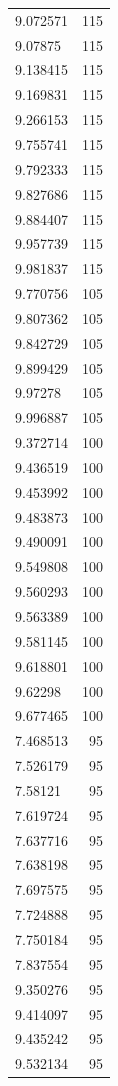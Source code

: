 \begin{table}[ht]
\begin{tabular}{lr}
  9.072571 & 115 \\ 
  9.07875 & 115 \\ 
  9.138415 & 115 \\ 
  9.169831 & 115 \\ 
  9.266153 & 115 \\ 
  9.755741 & 115 \\ 
  9.792333 & 115 \\ 
  9.827686 & 115 \\ 
  9.884407 & 115 \\ 
  9.957739 & 115 \\ 
  9.981837 & 115 \\ 
  9.770756 & 105 \\ 
  9.807362 & 105 \\ 
  9.842729 & 105 \\ 
  9.899429 & 105 \\ 
  9.97278 & 105 \\ 
  9.996887 & 105 \\ 
  9.372714 & 100 \\ 
  9.436519 & 100 \\ 
  9.453992 & 100 \\ 
  9.483873 & 100 \\ 
  9.490091 & 100 \\ 
  9.549808 & 100 \\ 
  9.560293 & 100 \\ 
  9.563389 & 100 \\ 
  9.581145 & 100 \\ 
  9.618801 & 100 \\ 
  9.62298 & 100 \\ 
  9.677465 & 100 \\ 
  7.468513 &  95 \\ 
  7.526179 &  95 \\ 
  7.58121 &  95 \\ 
  7.619724 &  95 \\ 
  7.637716 &  95 \\ 
  7.638198 &  95 \\ 
  7.697575 &  95 \\ 
  7.724888 &  95 \\ 
  7.750184 &  95 \\ 
  7.837554 &  95 \\ 
  9.350276 &  95 \\ 
  9.414097 &  95 \\ 
  9.435242 &  95 \\ 
  9.532134 &  95 \\ 

\end{tabular}
\end{table}
